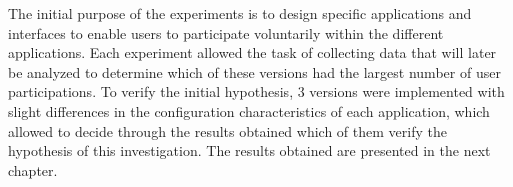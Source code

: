 The initial purpose of the experiments is to design specific applications and
interfaces to enable users to participate voluntarily within the different
applications. Each experiment allowed the task of collecting data that will
later be analyzed to determine which of these versions had the largest number of
user participations. To verify the initial hypothesis, 3  versions were implemented with
slight differences in the configuration characteristics of each application,
which allowed to decide through the results obtained which of them verify the
hypothesis of this investigation. The results obtained
are presented in the next chapter.
